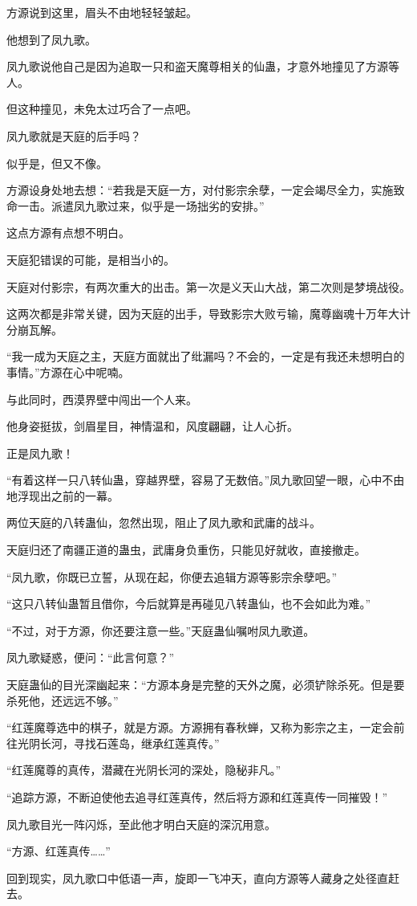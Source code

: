 \begin{this_body}
方源说到这里，眉头不由地轻轻皱起。

他想到了凤九歌。

凤九歌说他自己是因为追取一只和盗天魔尊相关的仙蛊，才意外地撞见了方源等人。

但这种撞见，未免太过巧合了一点吧。

凤九歌就是天庭的后手吗？

似乎是，但又不像。

方源设身处地去想：“若我是天庭一方，对付影宗余孽，一定会竭尽全力，实施致命一击。派遣凤九歌过来，似乎是一场拙劣的安排。”

这点方源有点想不明白。

天庭犯错误的可能，是相当小的。

天庭对付影宗，有两次重大的出击。第一次是义天山大战，第二次则是梦境战役。

这两次都是非常关键，因为天庭的出手，导致影宗大败亏输，魔尊幽魂十万年大计分崩瓦解。

“我一成为天庭之主，天庭方面就出了纰漏吗？不会的，一定是有我还未想明白的事情。”方源在心中呢喃。

与此同时，西漠界壁中闯出一个人来。

他身姿挺拔，剑眉星目，神情温和，风度翩翩，让人心折。

正是凤九歌！

“有着这样一只八转仙蛊，穿越界壁，容易了无数倍。”凤九歌回望一眼，心中不由地浮现出之前的一幕。

两位天庭的八转蛊仙，忽然出现，阻止了凤九歌和武庸的战斗。

天庭归还了南疆正道的蛊虫，武庸身负重伤，只能见好就收，直接撤走。

“凤九歌，你既已立誓，从现在起，你便去追辑方源等影宗余孽吧。”

“这只八转仙蛊暂且借你，今后就算是再碰见八转蛊仙，也不会如此为难。”

“不过，对于方源，你还要注意一些。”天庭蛊仙嘱咐凤九歌道。

凤九歌疑惑，便问：“此言何意？”

天庭蛊仙的目光深幽起来：“方源本身是完整的天外之魔，必须铲除杀死。但是要杀死他，还远远不够。”

“红莲魔尊选中的棋子，就是方源。方源拥有春秋蝉，又称为影宗之主，一定会前往光阴长河，寻找石莲岛，继承红莲真传。”

“红莲魔尊的真传，潜藏在光阴长河的深处，隐秘非凡。”

“追踪方源，不断迫使他去追寻红莲真传，然后将方源和红莲真传一同摧毁！”

凤九歌目光一阵闪烁，至此他才明白天庭的深沉用意。

“方源、红莲真传……”

回到现实，凤九歌口中低语一声，旋即一飞冲天，直向方源等人藏身之处径直赶去。

\end{this_body}

